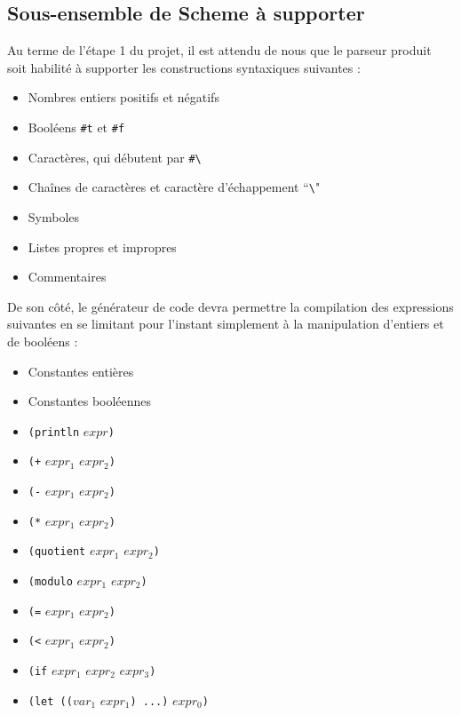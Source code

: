 \documentclass[12pt]{article}
\begin{document}
\subsection{Sous-ensemble de Scheme à supporter}
Au terme de l'étape 1 du projet, il est attendu de nous que le parseur produit soit habilité à supporter les constructions syntaxiques suivantes :

\begin{itemize}
\item Nombres entiers positifs et négatifs
\item Booléens \texttt{\#t} et \texttt{\#f}
\item Caractères, qui débutent par \texttt{\#\textbackslash}
\item Chaînes de caractères et caractère d'échappement ``\texttt{\textbackslash}"
\item Symboles
\item Listes propres et impropres
\item Commentaires
\end{itemize}

De son côté, le générateur de code devra permettre la compilation des expressions suivantes en se limitant pour l'instant simplement à la manipulation d'entiers et de booléens :

\begin{itemize}
\item Constantes entières
\item Constantes booléennes
\item \texttt{(println} $expr$\texttt{)}
\item \texttt{(+} $expr_1$ $expr_2$\texttt{)}
\item \texttt{(-} $expr_1$ $expr_2$\texttt{)}
\item \texttt{(*} $expr_1$ $expr_2$\texttt{)}
\item \texttt{(quotient} $expr_1$ $expr_2$\texttt{)}
\item \texttt{(modulo} $expr_1$ $expr_2$\texttt{)}
\item \texttt{(=} $expr_1$ $expr_2$\texttt{)}
\item \texttt{(<} $expr_1$ $expr_2$\texttt{)}
\item \texttt{(if} $expr_1$ $expr_2$ $expr_3$\texttt{)}
\item \texttt{(let ((}$var_1$ $expr_1$\texttt{) ...)} $expr_0$\texttt{)}
\end{itemize}
\end{document}
